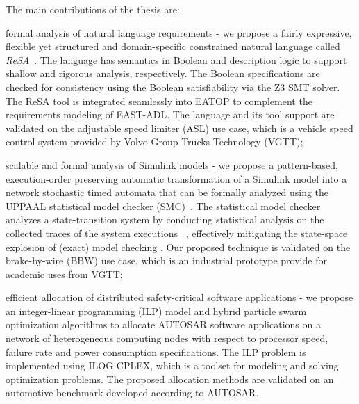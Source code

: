 The main contributions of the thesis are: 
\begin{enumerate*}[label=(\roman*)]
\item formal analysis of natural language requirements - we propose a fairly expressive, flexible yet structured and domain-specific constrained natural language called \textit{ReSA}~\cite{resatool}\cite{Mahmud2015ReSA:Systems}. The language has semantics in Boolean and description logic to support shallow and rigorous analysis, respectively. The Boolean specifications are checked for consistency using the Boolean satisfiability via the Z3 SMT solver.  The ReSA tool is integrated seamlessly into EATOP to complement the requirements modeling of EAST-ADL. The language and its tool support are validated on the adjustable speed limiter (ASL) use case, which is a vehicle speed control system provided by Volvo Group Trucks Technology (VGTT);

\item scalable and formal analysis of Simulink models - we propose a pattern-based, execution-order preserving automatic transformation of a Simulink model into a network stochastic timed automata that can be formally analyzed using the UPPAAL statistical model checker (SMC)~\cite{Filipovikj2016SimulinkSystems}. The statistical model checker analyzes a state-transition system by conducting statistical analysis on the collected traces of the system executions~ \cite{Bulychev2012UPPAAL-SMC:Automata}, effectively mitigating the state-space explosion of (exact) model checking \cite{Legay2010StatisticalOverview}. Our proposed technique is validated on the brake-by-wire (BBW) use case, which is an industrial prototype provide for academic uses from VGTT;

\item efficient allocation of distributed safety-critical software applications - we propose an integer-linear programming (ILP) model and hybrid particle swarm optimization algorithms to allocate AUTOSAR software applications on a network of heterogeneous computing nodes with respect to processor speed, failure rate and power consumption specifications. The  ILP problem is implemented using ILOG CPLEX, which is a toolset for modeling and solving optimization problems. The proposed allocation methods are validated on an automotive benchmark developed according to AUTOSAR.
\end{enumerate*}


